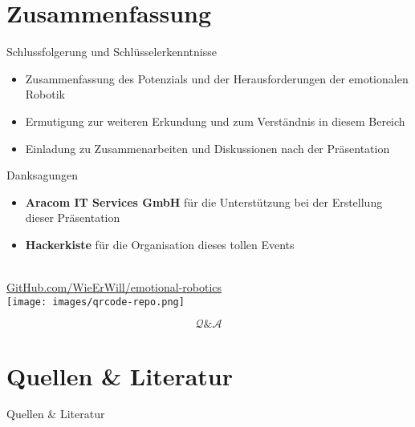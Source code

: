 \documentclass[aspectratio=169]{beamer}
\begin{document}
\section{Zusammenfassung}
\begin{frame}{Schlussfolgerung und Schlüsselerkenntnisse}
  \begin{itemize}
    \item Zusammenfassung des Potenzials und der Herausforderungen der emotionalen Robotik
    \item Ermutigung zur weiteren Erkundung und zum Verständnis in diesem Bereich
    \item Einladung zu Zusammenarbeiten und Diskussionen nach der Präsentation
  \end{itemize}
\end{frame}

\begin{frame}{Danksagungen}
  \begin{itemize}
    \item \textbf{Aracom IT Services GmbH} für die Unterstützung bei der Erstellung dieser Präsentation
    \item \textbf{Hackerkiste} für die Organisation dieses tollen Events
  \end{itemize}
\end{frame}

\begin{frame}[c]{}
  \centering
  \begin{minipage}{\textwidth}
    \centering
    \Large {}\\
    \href{https://github.com/wieerwill/emotional-robotics}{GitHub.com/WieErWill/emotional-robotics}\\
    \vspace{.4cm}
    \texttt{[image: images/qrcode-repo.png]}
  \end{minipage}
\end{frame}

\begin{frame}[c]{}
  \centering
  \begin{minipage}{\textwidth}
    \centering
    \Huge \[\mathcal Q \& \mathcal A\]
    \Large {}
  \end{minipage}
\end{frame}

\section{Quellen \& Literatur}
\begin{frame}[allowframebreaks]{Quellen \& Literatur}
  \scriptsize
  
  
\end{frame}
\end{document}
